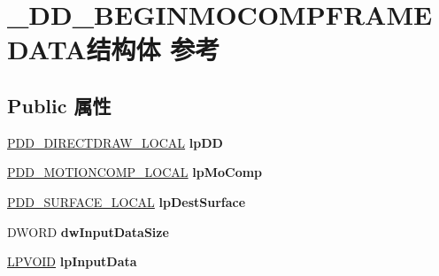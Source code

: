 \hypertarget{struct___d_d___b_e_g_i_n_m_o_c_o_m_p_f_r_a_m_e_d_a_t_a}{}\section{\+\_\+\+D\+D\+\_\+\+B\+E\+G\+I\+N\+M\+O\+C\+O\+M\+P\+F\+R\+A\+M\+E\+D\+A\+T\+A结构体 参考}
\label{struct___d_d___b_e_g_i_n_m_o_c_o_m_p_f_r_a_m_e_d_a_t_a}
\subsection*{Public 属性}
\begin{DoxyCompactItemize}
\item 
\mbox{\label{struct___d_d___b_e_g_i_n_m_o_c_o_m_p_f_r_a_m_e_d_a_t_a_a5d5da58a18ac30d80436a882e693c54d}} 
\hyperlink{struct___d_d___d_i_r_e_c_t_d_r_a_w___l_o_c_a_l}{P\+D\+D\+\_\+\+D\+I\+R\+E\+C\+T\+D\+R\+A\+W\+\_\+\+L\+O\+C\+AL} {\bfseries lp\+DD}
\item 
\mbox{\label{struct___d_d___b_e_g_i_n_m_o_c_o_m_p_f_r_a_m_e_d_a_t_a_a106b07d941dd5c4d31725297bbf27fe7}} 
\hyperlink{struct_d_d___m_o_t_i_o_n_c_o_m_p___l_o_c_a_l}{P\+D\+D\+\_\+\+M\+O\+T\+I\+O\+N\+C\+O\+M\+P\+\_\+\+L\+O\+C\+AL} {\bfseries lp\+Mo\+Comp}
\item 
\mbox{\label{struct___d_d___b_e_g_i_n_m_o_c_o_m_p_f_r_a_m_e_d_a_t_a_aba4a6c34aecbf0cb97a0597cc68dbe4a}} 
\hyperlink{struct___d_d___s_u_r_f_a_c_e___l_o_c_a_l}{P\+D\+D\+\_\+\+S\+U\+R\+F\+A\+C\+E\+\_\+\+L\+O\+C\+AL} {\bfseries lp\+Dest\+Surface}
\item 
\mbox{\label{struct___d_d___b_e_g_i_n_m_o_c_o_m_p_f_r_a_m_e_d_a_t_a_a1905f3ce4579bfcdbbbd32968258ffbb}} 
D\+W\+O\+RD {\bfseries dw\+Input\+Data\+Size}
\item 
\mbox{\label{struct___d_d___b_e_g_i_n_m_o_c_o_m_p_f_r_a_m_e_d_a_t_a_a94fbae97f5521deacb0da4bf0a7231fb}} 
\hyperlink{interfacevoid}{L\+P\+V\+O\+ID} {\bfseries lp\+Input\+Data}

\end{DoxyCompactItemize}
